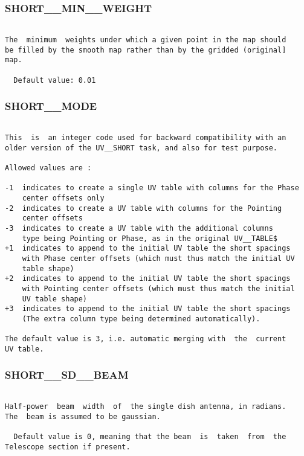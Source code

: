 \subsubsection{SHORT\_\_MIN\_\_WEIGHT}
\begin{verbatim}

The  minimum  weights under which a given point in the map should
be filled by the smooth map rather than by the gridded (original]
map.

  Default value: 0.01

\end{verbatim}
\subsubsection{SHORT\_\_MODE}
\begin{verbatim}

This  is  an integer code used for backward compatibility with an
older version of the UV__SHORT task, and also for test purpose.

Allowed values are :

-1  indicates to create a single UV table with columns for the Phase
    center offsets only
-2  indicates to create a UV table with columns for the Pointing
    center offsets
-3  indicates to create a UV table with the additional columns
    type being Pointing or Phase, as in the original UV__TABLE$
+1  indicates to append to the initial UV table the short spacings
    with Phase center offsets (which must thus match the initial UV
    table shape)
+2  indicates to append to the initial UV table the short spacings
    with Pointing center offsets (which must thus match the initial
    UV table shape)
+3  indicates to append to the initial UV table the short spacings
    (The extra column type being determined automatically).

The default value is 3, i.e. automatic merging with  the  current
UV table.

\end{verbatim}
\subsubsection{SHORT\_\_SD\_\_BEAM}
\begin{verbatim}

Half-power  beam  width  of  the single dish antenna, in radians.
The  beam is assumed to be gaussian.

  Default value is 0, meaning that the beam  is  taken  from  the
Telescope section if present.

\end{verbatim}
